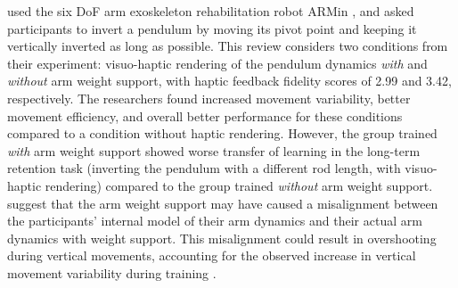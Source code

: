 \cite{Oezen2022} used the six DoF arm exoskeleton rehabilitation robot ARMin \cite{Just2018ExoskeletonObserver}, and asked participants to invert a pendulum by moving its pivot point and keeping it vertically inverted as long as possible. This review considers two conditions from their experiment: visuo-haptic rendering of the pendulum dynamics \textit{with} and \textit{without} arm weight support, with haptic feedback fidelity scores of 2.99 and 3.42, respectively. The researchers found increased movement variability, better movement efficiency, and overall better performance for these conditions compared to a condition without haptic rendering. However, the group trained \textit{with} arm weight support showed worse transfer of learning in the long-term retention task (inverting the pendulum with a different rod length, with visuo-haptic rendering) compared to the group trained \textit{without} arm weight support. \cite{Oezen2022} suggest that the arm weight support may have caused a misalignment between the participants' internal model of their arm dynamics and their actual arm dynamics with weight support. This misalignment could result in overshooting during vertical movements, accounting for the observed increase in vertical movement variability during training \cite{Oezen2022}.

